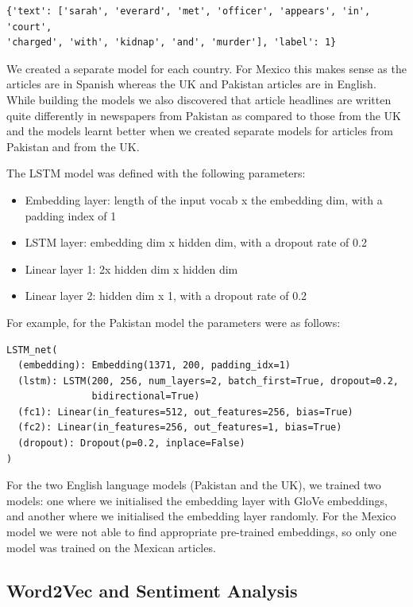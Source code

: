 \documentclass{article}
\begin{document}
{{{\begin{verbatim}
{'text': ['sarah', 'everard', 'met', 'officer', 'appears', 'in', 'court',
'charged', 'with', 'kidnap', 'and', 'murder'], 'label': 1}    
\end{verbatim}

We created a separate model for each country. For Mexico this makes sense as the articles are in Spanish whereas the UK and Pakistan articles are in English. While building the models we also discovered that article headlines are written quite differently in newspapers from Pakistan as compared to those from the UK and the models learnt better when we created separate models for articles from Pakistan and from the UK.  

The LSTM model was defined with the following parameters:
\begin{itemize}
  \item Embedding layer: length of the input vocab x the embedding dim, with a padding index of 1
  \item LSTM layer: embedding dim x hidden dim, with a dropout rate of 0.2
  \item Linear layer 1: 2x hidden dim x hidden dim
  \item Linear layer 2: hidden dim x 1, with a dropout rate of 0.2 
\end{itemize}

For example, for the Pakistan model the parameters were as follows:
\begin{verbatim}
LSTM_net(
  (embedding): Embedding(1371, 200, padding_idx=1)
  (lstm): LSTM(200, 256, num_layers=2, batch_first=True, dropout=0.2,
               bidirectional=True)
  (fc1): Linear(in_features=512, out_features=256, bias=True)
  (fc2): Linear(in_features=256, out_features=1, bias=True)
  (dropout): Dropout(p=0.2, inplace=False)
)\end{verbatim}

For the two English language models (Pakistan and the UK), we trained two models: one where we initialised the embedding layer with GloVe embeddings, and another where we initialised the embedding layer randomly. For the Mexico model we were not able to find appropriate pre-trained embeddings, so only one model was trained on the Mexican articles. 
}

}

\subsection{Word2Vec and Sentiment Analysis}{

}}
\end{document}
